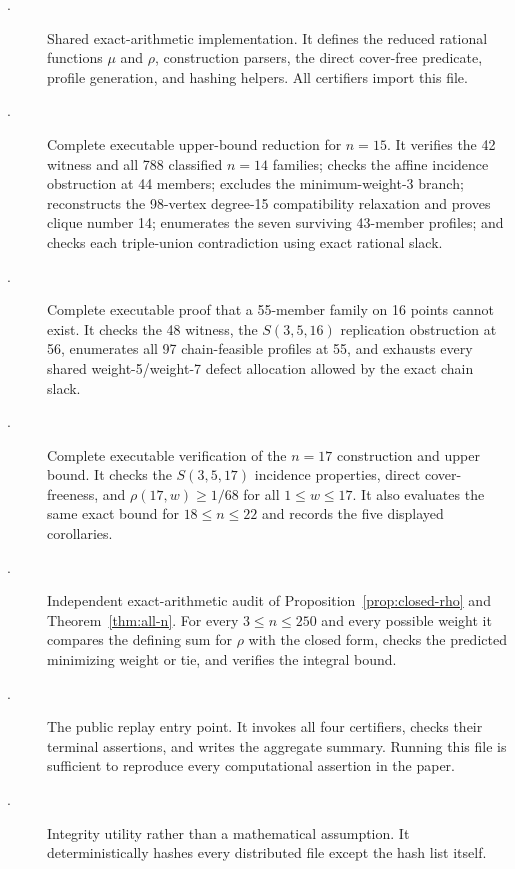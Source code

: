 \documentclass[11pt]{article}
\begin{document}
\begin{description}
 \item[.]
 Shared exact-arithmetic implementation.  It defines the reduced rational
 functions $\mu$ and $\rho$, construction parsers, the direct cover-free
 predicate, profile generation, and hashing helpers.  All certifiers import
 this file.

 \item[.]
 Complete executable upper-bound reduction for $n=15$.  It verifies the 42
 witness and all 788 classified $n=14$ families; checks the affine
 incidence obstruction at 44 members; excludes the minimum-weight-3 branch;
 reconstructs the 98-vertex degree-15 compatibility relaxation and proves
 clique number 14; enumerates the seven surviving 43-member profiles; and
 checks each triple-union contradiction using exact rational slack.

 \item[.]
 Complete executable proof that a 55-member family on 16 points cannot exist.
 It checks the 48 witness, the $S(3,5,16)$ replication obstruction at 56,
 enumerates all 97 chain-feasible profiles at 55, and exhausts every shared
 weight-5/weight-7 defect allocation allowed by the exact chain slack.

 \item[.]
 Complete executable verification of the $n=17$ construction and upper bound.
 It checks the $S(3,5,17)$ incidence properties, direct cover-freeness, and
 $\rho(17,w)\geq1/68$ for all $1\leq w\leq17$.  It also evaluates the same
 exact bound for $18\leq n\leq22$ and records the five displayed corollaries.

 \item[.]
 Independent exact-arithmetic audit of Proposition~\ref{prop:closed-rho} and
 Theorem~\ref{thm:all-n}.  For every $3\leq n\leq250$ and every possible
 weight it compares the defining sum for $\rho$ with the closed form, checks
 the predicted minimizing weight or tie, and verifies the integral bound.

 \item[.]
 The public replay entry point.  It invokes all four certifiers, checks their
 terminal assertions, and writes the aggregate summary.  Running this file is
 sufficient to reproduce every computational assertion in the paper.

 \item[.]
 Integrity utility rather than a mathematical assumption.  It deterministically
 hashes every distributed file except the hash list itself.
\end{description}
\end{document}
